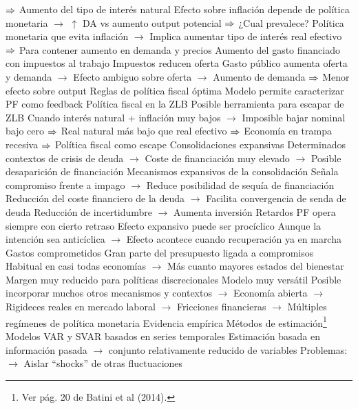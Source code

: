 \documentclass{nuevotema}
\begin{document}
\begin{esquemal}
				\4[] $\Rightarrow$ Aumento del tipo de interés natural
				\4[] Efecto sobre inflación depende de política monetaria
				\4[] $\to$ $\uparrow$ DA vs aumento output potencial
				\4[] $\Rightarrow$ ¿Cual prevalece?
				\4[] Política monetaria que evita inflación
				\4[] $\to$ Implica aumentar tipo de interés real efectivo
				\4[] $\Rightarrow$ Para contener aumento en demanda y precios
				\4 Aumento del gasto financiado con impuestos al trabajo
				\4[] Impuestos reducen oferta
				\4[] Gasto público aumenta oferta y demanda
				\4[] $\to$ Efecto ambiguo sobre oferta
				\4[] $\to$ Aumento de demanda
				\4[] $\Rightarrow$ Menor efecto sobre output
				\4 Reglas de política fiscal óptima
				\4[] Modelo permite caracterizar PF como feedback
				\4 Política fiscal en la ZLB
				\4[] Posible herramienta para escapar de ZLB
				\4[] Cuando interés natural + inflación muy bajos
				\4[] $\to$ Imposible bajar nominal bajo cero
				\4[] $\Rightarrow$ Real natural más bajo que real efectivo
				\4[] $\Rightarrow$ Economía en trampa recesiva
				\4[] $\Rightarrow$ Política fiscal como escape
				\4 Consolidaciones expansivas
				\4[] Determinados contextos de crisis de deuda
				\4[] $\to$ Coste de financiación muy elevado
				\4[] $\to$ Posible desaparición de financiación
				\4 Mecanismos expansivos de la consolidación
				\4[] Señala compromiso frente a impago
				\4[] $\to$ Reduce posibilidad de sequía de financiación
				\4[] Reducción del coste financiero de la deuda
				\4[] $\to$ Facilita convergencia de senda de deuda
				\4[] Reducción de incertidumbre
				\4[] $\to$ Aumenta inversión
			\3 Retardos
				\4 PF opera siempre con cierto retraso
				\4 Efecto expansivo puede ser procíclico
				\4[] Aunque la intención sea anticíclica
				\4[] $\to$ Efecto acontece cuando recuperación ya en marcha
			\3 Gastos comprometidos
				\4 Gran parte del presupuesto ligada a compromisos
				\4[] Habitual en casi todas economías
				\4[] $\to$ Más cuanto mayores estados del bienestar
				\4 Margen muy reducido para políticas discrecionales
				\4 Modelo muy versátil
				\4[] Posible incorporar muchos otros mecanismos y contextos
				\4[] $\to$ Economía abierta
				\4[] $\to$ Rigideces reales en mercado laboral
				\4[] $\to$ Fricciones financieras
				\4[] $\to$ Múltiples regímenes de política monetaria
		\2 Evidencia empírica
			\3 Métodos de estimación\footnote{Ver pág. 20 de Batini et al (2014).}
				\4 Modelos VAR y SVAR basados en series temporales
				\4[] Estimación basada en información pasada
				\4[] $\to$ conjunto relativamente reducido de variables
				\4[] Problemas:
				\4[] $\to$ Aislar ``shocks'' de otras fluctuaciones

\end{esquemal}
\end{document}
